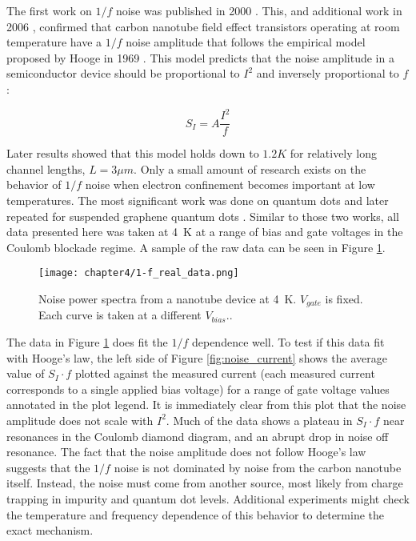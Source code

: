 The first work on $1/f$ noise was published in 2000 \cite{Collins2000}. This, and additional work in 2006 \cite{Ishigami2006}, confirmed that carbon nanotube field effect transistors operating at room temperature have a $1/f$ noise amplitude that follows the empirical model proposed by Hooge in 1969 \cite{Hooge1969}. This model predicts that the noise amplitude in a semiconductor device should be proportional to $I^2$ and inversely proportional to $f$:

\begin{equation}
    \label{eq:hooge}
    S_{I} = A\frac{I^2}{f}
\end{equation}

Later results \cite{Tobias2008} showed that this model holds down to $1.2K$ for relatively long channel lengths, $L=3\mu m$. Only a small amount of research exists on the behavior of $1/f$ noise when electron confinement becomes important at low temperatures. The most significant work was done on  quantum dots \cite{Jung2004} and later repeated for suspended graphene quantum dots \cite{Song2015}. Similar to those two works, all data presented here was taken at \SI{4}{\kelvin} at a range of bias and gate voltages in the Coulomb blockade regime. A sample of the raw data can be seen in Figure \ref{fig:1-f_data}.

\begin{figure}
    \centering
    \texttt{[image: chapter4/1-f\_real\_data.png]}
    \caption{Noise power spectra from a nanotube device at \SI{4}{\kelvin}. $V_{gate}$ is fixed. Each curve is taken at a different $V_{bias}.$.}
    \label{fig:1-f_data}
\end{figure}

The data in Figure \ref{fig:1-f_data} does fit the $1/f$ dependence well. To test if this data fit with Hooge's law, the left side of Figure \ref{fig:noise_current} shows the average value of $S_I \cdot f$ plotted against the measured current (each measured current corresponds to a single applied bias voltage) for a range of gate voltage values annotated in the plot legend. It is immediately clear from this plot that the noise amplitude does not scale with $I^2$. Much of the data shows a plateau in $S_I \cdot f$ near resonances in the Coulomb diamond diagram, and an abrupt drop in noise off resonance. The fact that the noise amplitude does not follow Hooge's law suggests that the $1/f$ noise is not dominated by noise from the carbon nanotube itself. Instead, the noise must come from another source, most likely from charge trapping in impurity and quantum dot levels. Additional experiments might check the temperature and frequency dependence of this behavior to determine the exact mechanism.

